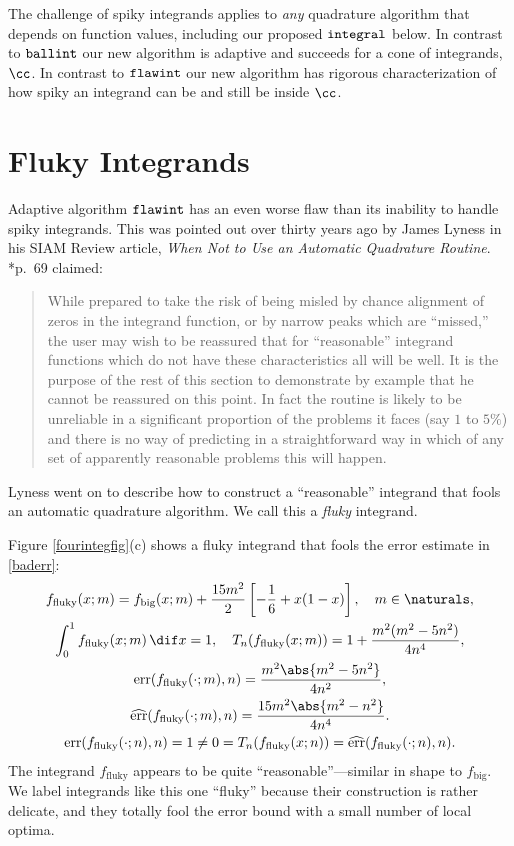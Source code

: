 \documentclass[]{article}
\DeclareMathOperator{\integ}{\texttt{\textup{integral}}}
\DeclareMathOperator{\flawinteg}{\texttt{\textup{flawint}}}
\DeclareMathOperator{\ballinteg}{\texttt{\textup{ballint}}}
\DeclareMathOperator{\err}{err}
\newcommand{\herr}{\widehat{\err}}
\theoremstyle{definition}
\theoremstyle{remark}
\begin{document}
The challenge of spiky integrands applies to \emph{any} quadrature algorithm that depends on function values, including our proposed $\integ$ below.  In contrast to $\ballinteg$ our new algorithm is adaptive and succeeds for a cone of integrands, $\cc$.  In contrast to $\flawinteg$ our new algorithm has rigorous characterization of how spiky an integrand can be and still be inside $\cc$.


\section{Fluky Integrands} \label{flukysubsec}

Adaptive algorithm $\flawinteg$ has an even worse flaw than its inability to handle spiky integrands.  This was pointed out over thirty years ago by James Lyness in his SIAM Review article, \emph{When Not to Use an Automatic Quadrature Routine}.  *{p.\ 69} claimed:
\begin{quote}
While prepared to take the risk of being misled by chance alignment of zeros in the integrand function, or by narrow peaks which are ``missed,'' the user may wish to be reassured that for ``reasonable'' integrand functions which do not have these characteristics all will be well. It is the purpose of the rest of this section to demonstrate by example that he cannot be reassured on this point. In fact the routine is likely to be unreliable in a significant proportion of the problems it faces (say $1$ to $5\%$) and there is no way of predicting in a straightforward way in which of any set of apparently reasonable problems this will happen.
\end{quote}
Lyness went on to describe how to construct a ``reasonable'' integrand that fools an automatic quadrature algorithm.  We call this a \emph{fluky} integrand.  

Figure \ref{fourintegfig}(c) shows a fluky integrand that fools the error estimate in \eqref{baderr}:
\begin{subequations} \label{fluky}
\begin{gather} 
f_{\text{fluky}}(x;m) = f_{\text{big}}(x;m) + \frac{15m^2}{2}\left[- \frac{1}{6}+ x(1-x) \right], \quad m \in \naturals, \\
\int_0^1 f_{\text{fluky}}(x;m) \, \dif x =  1, \quad T_{n}(f_{\text{fluky}}(x;m))=1 + \frac{m^2(m^2-5 n^2)}{4n^4}, \\
\err(f_{\text{fluky}}(\cdot;m),n)=\frac{m^2 \abs{m^2-5n^2}}{4n^2}, \\
 \herr(f_{\text{fluky}}(\cdot;m),n) = \frac{15 m^2 \abs{m^2-n^2}}{4 n^4}.
\\
\label{failcond}
\err(f_{\text{fluky}}(\cdot;n),n)=1 \ne 0 = T_{n}(f_{\text{fluky}}(x;n)) = \herr(f_{\text{fluky}}(\cdot;n),n).
\end{gather}
\end{subequations}
The integrand $f_{\text{fluky}}$ appears to be quite ``reasonable''---similar in shape to $f_{\text{big}}$.  We label integrands like this one ``fluky'' because their construction is rather delicate, and they totally fool the error bound with a small number of local optima.
\end{document}
